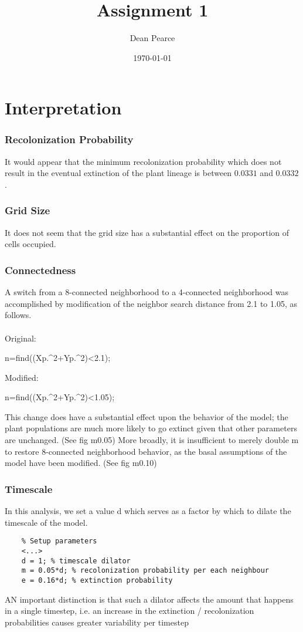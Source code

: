 \documentclass[titlepage]{scrartcl}
\title{Assignment 1}
\date{\today}
\author{Dean Pearce}
\begin{document}
\maketitle
\part*{Interpretation}
\section{Recolonization Probability}
It would appear that the minimum recolonization probability which does not result in the eventual extinction of the plant lineage is between $ 0.0331 $ and $ 0.0332 $.
\section{Grid Size}
It does not seem that the grid size has a substantial effect on the proportion of cells occupied.
\section{Connectedness}
A switch from a 8-connected neighborhood to a 4-connected neighborhood was accomplished by modification of the neighbor search distance from 2.1 to 1.05, as follows.\\\\
Original:
\begin{verbatim*}
n=find((Xp.^2+Yp.^2)<2.1);
\end{verbatim*}
Modified:
\begin{verbatim*}
n=find((Xp.^2+Yp.^2)<1.05);
\end{verbatim*}
This change does have a substantial effect upon the behavior of the model; the plant populations are much more likely to go extinct given that other parameters are unchanged. (See fig m0.05)  More broadly, it is insufficient to merely double m to restore 8-connected neighborhood behavior, as the basal assumptions of the model have been modified. (See fig m0.10)
\section{Timescale}
In this analysis, we set a value d which serves as a factor by which to dilate the timescale of the model.
\begin{verbatim}
	% Setup parameters
	<...>
	d = 1; % timescale dilator
	m = 0.05*d; % recolonization probability per each neighbour
	e = 0.16*d; % extinction probability
\end{verbatim}
AN important distinction is that such a dilator affects the amount that happens in a single timestep, i.e. an increase in the extinction / recolonization probabilities causes greater variability per timestep
\end{document}
